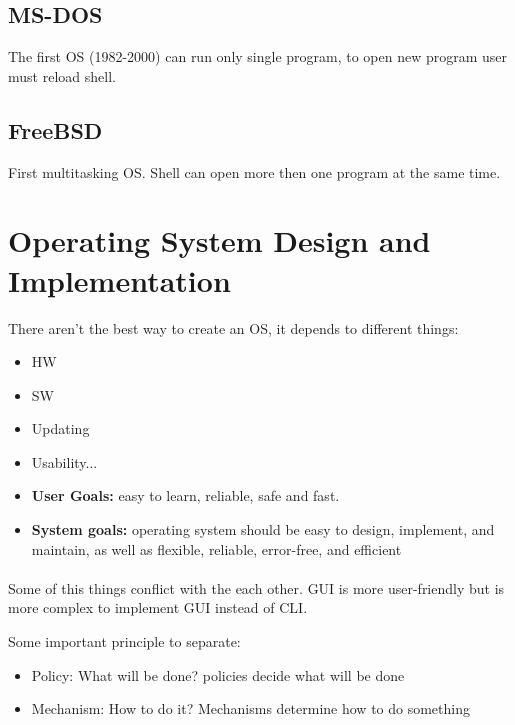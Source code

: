 \newpage
\subsection{MS-DOS}

The first OS (1982-2000) can run only single program, to open new program user must reload shell.

\subsection{FreeBSD}

First multitasking OS. Shell can open more then one program at the same time.

\section{Operating System Design and Implementation}
There aren't the best way to create an OS, it depends to different things:

\begin{itemize}
    \item HW
    \item SW
    \item Updating
    \item Usability...
\end{itemize}

\begin{itemize}
    \item \textbf{User Goals: }easy to learn, reliable, safe and fast.
    \item \textbf{System goals: }operating system should be easy to design, implement, and maintain, as well as flexible, reliable, error-free, and efficient
\end{itemize}

\paragraph{}
Some of this things conflict with the each other. GUI is more user-friendly but is more complex to implement GUI instead of CLI.

Some important principle to separate:

\begin{itemize}
    \item Policy: What will be done? policies decide what will be done

    \item Mechanism: How to do it? Mechanisms determine how to do something
\end{itemize}

